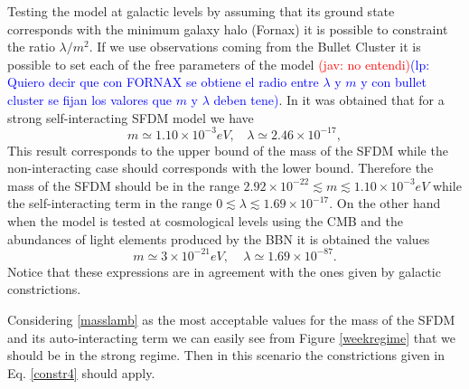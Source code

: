 \documentclass[amssymb,twocolumn,prd,nofootinbib,showpacs]{revtex4-1}
\newcommand{\jav}[1]{\textcolor{red}{(jav: #1)}}
\newcommand{\lp}[1]{\textcolor{blue}{(lp: #1)}}
\begin{document}
Testing the model at galactic levels by assuming that its ground state 
corresponds with the minimum galaxy halo (Fornax) \cite{SFphi42} it is possible to constraint the ratio $\lambda/m^2$. 
If we use observations coming from the Bullet Cluster \cite{bullet} it is possible to set each of the free parameters of the model \jav{no entendi}\lp{Quiero decir que con FORNAX se obtiene el radio entre $\lambda$ y $m$ y con bullet cluster se fijan los valores que $m$ y $\lambda$ deben tene}. 
In \cite{SFphi42} it was obtained that for a strong self-interacting SFDM model we have
%
\begin{equation}
m\simeq 1.10\times10^{-3}eV, \ \ \ \ \lambda \simeq 2.46\times 10^{-17},
\end{equation}
%
This result corresponds to the upper bound of the mass of the SFDM while the non-interacting case should corresponds with the lower bound. Therefore the mass of the SFDM should be in the range $2.92\times 10^{-22}\lesssim m\lesssim 1.10\times 10^{-3}eV$ while the self-interacting term in the range $0\lesssim \lambda \lesssim 1.69\times 10^{-17}$. On the other hand when the model is tested at cosmological levels using the CMB and the 
abundances of light elements produced by the BBN it is obtained the values \cite{SFphi41,SFphi42}
%
\begin{equation}\label{masslamb}
m\simeq3\times 10^{-21}eV, \ \ \ \ \ \lambda \simeq 1.69\times 10^{-87}.
\end{equation}
%
Notice that these expressions are in agreement with the ones given by galactic constrictions.

Considering \eqref{masslamb} as the most acceptable values for the mass of the SFDM and 
its auto-interacting term we can easily see from Figure \ref{weekregime} that we should be in the strong regime. 
Then in this scenario the constrictions given in Eq. \eqref{constr4} should apply. 
\end{document}
